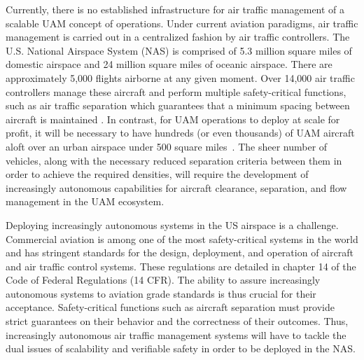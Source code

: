 Currently, there is no established infrastructure for air traffic management of a scalable UAM concept of operations. Under current aviation paradigms, air traffic management is carried out in a centralized fashion by air traffic controllers.  The U.S. National Airspace System (NAS) is comprised of 5.3 million square miles of domestic airspace and 24 million square miles of oceanic airspace.  There are approximately 5,000 flights airborne at any given moment.  Over 14,000 air traffic controllers manage these aircraft and perform multiple safety-critical functions, such as air traffic separation which guarantees that a minimum spacing between aircraft is maintained \cite{FAAData}.  In contrast, for UAM operations to deploy at scale for profit, it will be necessary to have hundreds (or even thousands) of UAM aircraft aloft over an urban airspace under 500 square miles~\cite{goyal2018urban}.  The sheer number of vehicles, along with the necessary reduced separation criteria between them in order to achieve the required densities, will require the development of increasingly autonomous capabilities for aircraft clearance, separation, and flow management in the UAM ecosystem.  

Deploying increasingly autonomous systems in the US airspace is a challenge. Commercial aviation is among one of the most safety-critical systems in the world and has stringent standards for the design, deployment, and operation of aircraft and air traffic control systems. These regulations are detailed in chapter 14 of the Code of Federal Regulations (14 CFR). The ability to assure increasingly autonomous systems to aviation grade standards is thus crucial for their acceptance.  Safety-critical functions such as aircraft separation must provide strict guarantees on their behavior and the correctness of their outcomes.  Thus, increasingly autonomous air traffic management systems will have to tackle the dual issues of scalability and verifiable safety in order to be deployed in the NAS.



